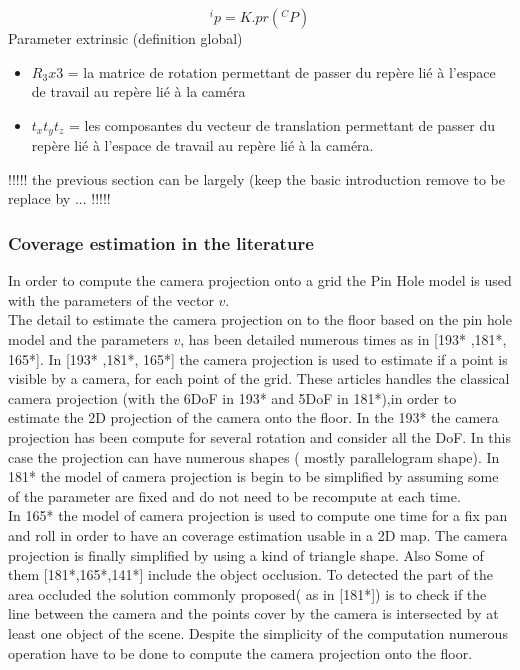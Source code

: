 $$
^ip=K.pr(^CP)
$$ 	  
 Parameter extrinsic (definition global) \\
  \begin{itemize}
 	\item$R_3x3$ = la matrice de rotation permettant de passer du repère lié à l'espace de travail au repère lié à la caméra\\
 	\item$t_x t_y t_z$ = les composantes du vecteur de translation permettant de passer du repère lié à l'espace de travail au repère lié à la caméra.\\
  \end{itemize}
 
!!!!! the previous section can be largely (keep the basic introduction remove to be replace by ... !!!!!
\fi
\subsubsection{Coverage estimation in the literature}

 In order to compute the camera projection onto a grid the Pin Hole model is used with the parameters of the vector $v$.\\
 
The detail to estimate the camera projection on to the floor based on the pin hole model and the parameters $v$, has been detailed numerous times as in  [193* ,181*, 165*]. In [193* ,181*, 165*] the camera projection is used to estimate if a point is visible by a camera, for each point of the grid. These articles handles the classical camera projection (with the 6DoF in 193* and 5DoF in 181*),in order to estimate the 2D projection of the camera onto the floor. 
In the 193* the camera projection has been compute for several rotation and consider all the DoF. In this case the projection can have numerous shapes ( mostly parallelogram shape).
In 181* the  model of camera projection is begin to be simplified by assuming some of the parameter are fixed and do not need to be recompute at each time.  \\
In 165* the model of camera projection is used to compute one time for a fix pan and roll in order to have an coverage estimation usable in a 2D map. The camera projection is finally simplified by using a kind of triangle shape.
 Also Some of them [181*,165*,141*] include the object occlusion. To detected the part of the area occluded the solution commonly proposed( as in [181*]) is to check  if the line between the camera and the points cover by the camera is intersected by at least one object of the scene. 
  Despite the simplicity of the computation numerous operation have to be done to compute the camera projection onto the floor. \\

